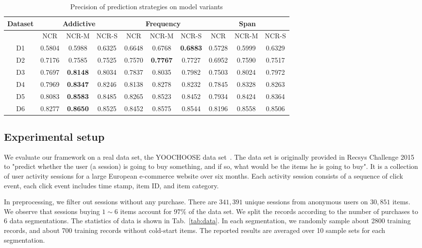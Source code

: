\documentclass[sigconf]{acmart}
\begin{document}
\begin{table*}[htbp]
\caption{Precision of prediction strategies on model variants }
\label{tab:strategy}
\begin{tabular}{|c|c|c|c|c|c|c|c|c|c|}
\hline
Dataset & \multicolumn{3}{|c|}{Addictive} &  \multicolumn{3}{|c|}{Frequency} & \multicolumn{3}{|c|}{Span} \\\hline
  & NCR & NCR-M & NCR-S  & NCR & NCR-M & NCR-S  & NCR & NCR-M & NCR-S \\\hline
D1 & 0.5804	& 0.5988	& 0.6325& 	0.6648& 	0.6768& 	\bf{0.6883}& 	0.5728	& 0.5999	& 0.6329 \\\hline
D2& 0.7176	& 0.7585	& 0.7525	& 0.7570	& \bf{0.7767}	& 0.7727	& 0.6952	& 0.7590& 	0.7517	\\\hline
D3& 0.7697	& \bf{0.8148}	& 0.8034	& 0.7837& 	0.8035	& 0.7982	& 0.7503	& 0.8024& 	0.7972	\\\hline
D4& 0.7969& 	\bf{0.8347}	& 0.8246	& 0.8138	& 0.8278	& 0.8232& 	0.7845	& 0.8328	& 0.8263\\\hline
D5& 0.8083	& \bf{0.8583}& 	0.8485& 	0.8265& 	0.8523& 	0.8452	& 0.7934 &	0.8424& 	0.8364\\\hline
D6& 0.8277	& \bf{0.8650}	& 0.8525	& 0.8452& 	0.8575& 	0.8544& 	0.8196	& 0.8558	& 0.8506	\\ \hline 
\end{tabular}
\end{table*}

\subsection{Experimental setup}

We evaluate our framework on a real data set, the YOOCHOOSE data set~\cite{Ben-Shimon2015RecSys}. The data set is originally provided in Recsys Challenge 2015 to "predict whether the user (a session) is going to buy something, and if so, what would be the items he is going to buy". It is a collection of user activity sessions for a large
European e-commerce website over six months. Each activity session consists of a sequence of click event, each click event includes time stamp, item ID, and item category. 

In preprocessing, we filter out sessions without any purchase. There are $341,391$ unique sessions from anonymous users on $30,851$ items.  We observe that sessions buying $1\sim 6$ items account for $97\%$ of the data set. We split the records according to the number of purchases to 6 data segmentations. The statistics of data is shown in Tab.~\ref{tab:data}. In each segmentation, we randomly sample about 2800 training records, and about 700 training records without cold-start items. The reported results are averaged over 10  sample sets for each segmentation.
    
\end{document}
